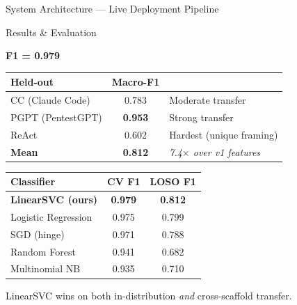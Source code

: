 \documentclass[final]{beamer}
\newlength{\colwidth}
\begin{document}
\begin{frame}[t]
\begin{columns}[t]
\begin{column}{\colwidth}
\begin{block}{System Architecture --- Live Deployment Pipeline}
  \end{block}

  \begin{block}{Results \& Evaluation}


    \begin{center}
      {\fontsize{42}{48}\selectfont \textbf{F1 = 0.979}} 
    \end{center}


    \begin{table}
      \centering
      \begin{tabular}{l c l}
        \toprule
        \textbf{Held-out} & \textbf{Macro-F1} & \\
        \midrule
        CC (Claude Code)  & 0.783 & Moderate transfer \\
        PGPT (PentestGPT) & \textbf{0.953} & Strong transfer \\
        ReAct              & 0.602 & Hardest (unique framing) \\
        \midrule
        \textbf{Mean} & \textbf{0.812} & \textit{7.4$\times$ over v1 features} \\
        \bottomrule
      \end{tabular}
    \end{table}


    \begin{table}
      \centering
      \begin{tabular}{l c c}
        \toprule
        \textbf{Classifier} & \textbf{CV F1} & \textbf{LOSO F1} \\
        \midrule
        \rowcolor{wingreen} \textbf{LinearSVC (ours)} & \textbf{0.979} & \textbf{0.812} \\
        Logistic Regression & 0.975 & 0.799 \\
        SGD (hinge) & 0.971 & 0.788 \\
        Random Forest & 0.941 & 0.682 \\
        Multinomial NB & 0.935 & 0.710 \\
        \bottomrule
      \end{tabular}
    \end{table}

    LinearSVC wins on both in-distribution \emph{and} cross-scaffold transfer.


\end{block}
\end{column}
\end{columns}
\end{frame}
\end{document}

